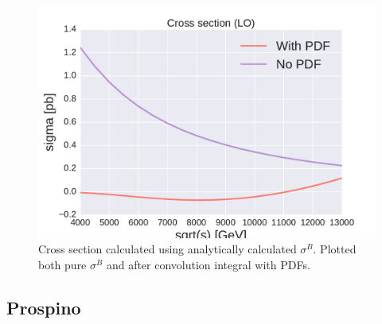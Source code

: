 \documentclass[11pt]{article}
\begin{document}
\begin{figure}[H]
\centering
\includegraphics[scale=0.6]{plots/Negative_values_analysis/sigma_2000_800_pdftest.pdf}
\caption{Cross section calculated using analytically calculated $\sigma^B$. Plotted both pure $\sigma^B$ and after convolution integral with PDFs.}
\label{fig:: 800 2000 med og uten pdf}
\end{figure}



\subsection*{Prospino}
\end{document}
